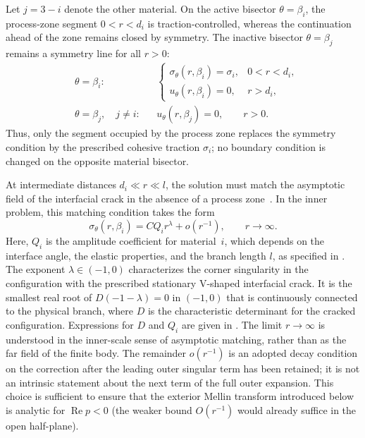 \documentclass[pdflatex,onecolumn,sn-mathphys-ay]{sn-jnl}
\begin{document}
Let $j=3-i$ denote the other material. On the active bisector
$\theta=\beta_i$, the process-zone segment $0<r<d_i$ is traction-controlled,
whereas the continuation ahead of the zone remains closed by
symmetry. The inactive bisector $\theta=\beta_j$ remains a symmetry line
for all $r>0$:
\begin{equation}
\label{eq:process-zone-boundary-conditions}
\begin{aligned}
  &\theta=\beta_i: &&
  \begin{cases}
    \sigma_\theta(r,\beta_i)=\sigma_i, & 0<r<d_i,\\
    u_\theta(r,\beta_i)=0, & r>d_i,
  \end{cases}\\[4pt]
  &\theta=\beta_j,\quad j\ne i: &&
    u_\theta(r,\beta_j)=0,\qquad r>0.
\end{aligned}
\end{equation}
Thus, only the segment occupied by the process zone replaces the symmetry
condition by the prescribed cohesive traction $\sigma_i$; no boundary
condition is changed on the opposite material bisector.

At intermediate distances $d_i\ll r\ll l$, the solution must match the
asymptotic field of the interfacial crack in the absence of a process
zone~\citep{NazarenkoKipnis2022Stress}. In the inner problem, this matching
condition takes the form
\begin{equation}
\label{eq:matched-far-field}
  \sigma_\theta(r,\beta_i)
    =CQ_i r^\lambda+o\!\left(r^{-1}\right),
    \qquad r\to\infty.
\end{equation}
Here, $Q_i$ is the amplitude coefficient for material~$i$, which depends
on the interface angle, the elastic properties, and the branch length
$l$, as specified in \AsymptoticsAppendix. The exponent
$\lambda\in(-1,0)$ characterizes the corner singularity in the
configuration with the prescribed stationary V-shaped interfacial crack. It is the smallest real root of
$D(-1-\lambda)=0$ in $(-1,0)$ that is continuously connected to the
physical branch, where $D$ is the characteristic determinant for the
cracked configuration. Expressions for $D$ and $Q_i$ are given in
\AsymptoticsAppendix. The limit $r\to\infty$ is understood in the inner-scale sense of
asymptotic matching, rather than as the far field of the finite body. The
remainder $o(r^{-1})$ is an adopted decay condition on the correction after
the leading outer singular term has been retained; it is not an intrinsic
statement about the next term of the full outer expansion. This choice is
sufficient to ensure that the exterior Mellin transform introduced below is
analytic for $\operatorname{Re}p<0$ (the weaker bound $O(r^{-1})$ would already
suffice in the open half-plane).
\end{document}

